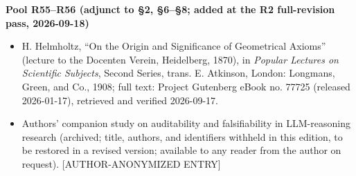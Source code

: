 \documentclass[11pt,a4paper]{article}
\begin{document}
\medskip
\noindent\textbf{Pool R55–R56 (adjunct to §2, §6–§8; added at the R2 full-revision pass, 2026-09-18)}\par\addvspace{2pt}

\begin{itemize}[leftmargin=1.6em,itemsep=2pt,parsep=0pt,topsep=3pt]
\item[R55.] H. Helmholtz, ``On the Origin and Significance of Geometrical Axioms'' (lecture to the Docenten Verein, Heidelberg, 1870), in \textit{Popular Lectures on Scientific Subjects}, Second Series, trans. E. Atkinson, London: Longmans, Green, and Co., 1908; full text: Project Gutenberg eBook no. 77725 (released 2026-01-17), retrieved and verified 2026-09-17.
\item[R56.] Authors' companion study on auditability and falsifiability in LLM-reasoning research (archived; title, authors, and identifiers withheld in this edition, to be restored in a revised version; available to any reader from the author on request). [AUTHOR-ANONYMIZED ENTRY]
\end{itemize}
\end{document}
